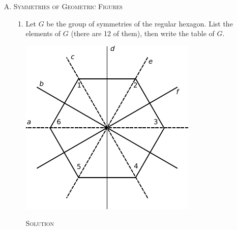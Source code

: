 \documentclass[twoside]{amsart}
\newcommand{\solution}{\textsc{Solution}\xspace}
\begin{document}
\begin{enumerate}[A.]
\begin{enumerate}[1]
   \end{enumerate}

   \item \textsc{Symmetries of Geometric Figures}

   \begin{enumerate}[1]
      \item Let $G$ be the group of symmetries of the regular hexagon. List
      the elements of $G$ (there are 12 of them), then write the table of $G$.

      \begin{center}
      \includegraphics{img/chap7f.pdf}
      \end{center}

      \solution 


\end{enumerate}
\end{enumerate}
\end{document}
